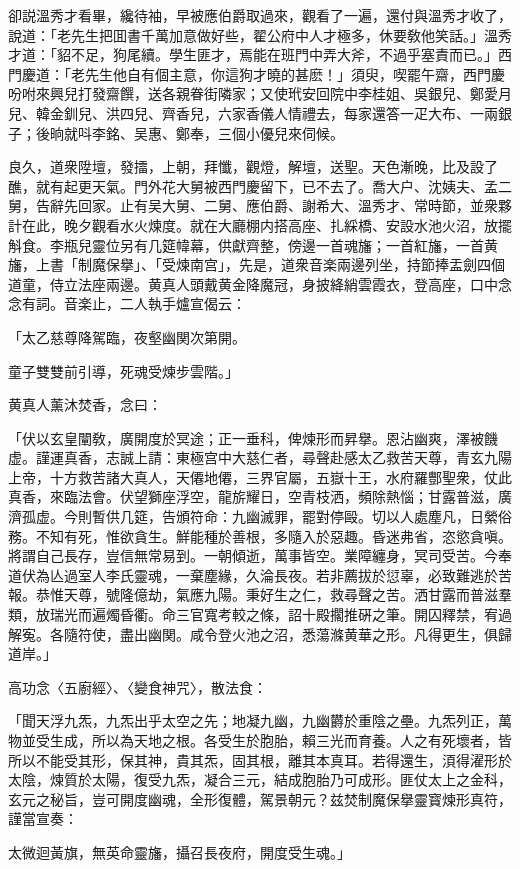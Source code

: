 卻説溫秀才看畢，纔待袖，早被應伯爵取過來，觀看了一遍，還付與溫秀才收了，說道：「老先生把囬書千萬加意做好些，翟公府中人才極多，休要敎他笑話。」溫秀才道：「貂不足，狗尾續。學生匪才，焉能在班門中弄大斧，不過乎塞責而已。」西門慶道：「老先生他自有個主意，你這狗才曉的甚麽！」須臾，喫罷午齋，西門慶吩咐來興兒打發齋饌，送各親眷街隣家；又使玳安回院中李桂姐、吳銀兒、鄭愛月兒、韓金釧兒、洪四兒、齊香兒，六家香儀人情禮去，每家還答一疋大布、一兩銀子；後晌就呌李銘、吴惠、鄭奉，三個小優兒來伺候。

良久，道衆陞壇，發擂，上朝，拜懺，觀燈，解壇，送聖。天色漸晚，比及設了醮，就有起更天氣。門外花大舅被西門慶留下，已不去了。喬大户、沈姨夫、孟二舅，告辭先回家。止有吴大舅、二舅、應伯爵、謝希大、溫秀才、常時節，並衆夥計在此，晚夕觀看水火煉度。就在大廳棚内搭高座、扎綵橋、安設水池火沼，放擺斛食。李瓶兒靈位另有几筵幃幕，供獻齊整，傍邊一首魂旛；一首紅旛，一首黄旛，上書「制魔保擧」、「受煉南宫」，先是，道衆音楽兩邊列坐，持節捧盂劍四個道童，侍立法座兩邊。黄真人頭戴黄金降魔冠，身披絳綃雲霞衣，登高座，口中念念有詞。音楽止，二人執手爐宣偈云：

\begin{myquote}
「太乙慈尊降駕臨，夜壑幽関次第開。

童子雙雙前引導，死魂受煉步雲階。」
\end{myquote}

黄真人薰沐焚香，念曰：

\begin{myquote}[\markfont]
「伏以玄皇闡敎，廣開度於冥途；正一垂科，俾煉形而昇擧。恩沾幽爽，澤被饑虚。謹運真香，志誠上請：東極宫中大慈仁者，尋聲赴感太乙救苦天尊，青玄九陽上帝，十方救苦諸大真人，天僊地僊，三界官屬，五嶽十王，水府羅酆聖衆，仗此真香，來臨法會。伏望獅座浮空，龍旂耀日，空青枝洒，頻除熱惱；甘露普滋，廣濟孤虚。今則暫供几筵，告頒符命：九幽滅罪，罷對停毆。切以人處塵凡，日縈俗務。不知有死，惟欲貪生。鮮能種於善根，多隨入於惡趣。昏迷弗省，恣慾貪嗔。將謂自己長存，豈信無常易到。一朝傾逝，萬事皆空。業障纏身，冥司受苦。今奉道伏為亾過室人李氏靈魂，一棄塵緣，久淪長夜。若非薦拔於愆辜，必致難逃於苦報。恭惟天尊，號隆億劫，氣應九陽。秉好生之仁，救尋聲之苦。洒甘露而普滋羣類，放瑞光而遍燭昏衢。命三官寬考較之條，詔十殿擱推硏之筆。開囚釋禁，宥過解寃。各隨符使，盡出幽関。咸令登火池之沼，悉蕩滌黄華之形。凡得更生，俱歸道岸。」
\end{myquote}

高功念〈五廚經〉、〈變食神咒〉，散法食：

\begin{myquote}[\markfont]
「聞天浮九炁，九炁出乎太空之先；地凝九幽，九幽欝於重陰之壘。九炁列正，萬物並受生成，所以為天地之根。各受生於胞胎，賴三光而育養。人之有死壞者，皆所以不能受其形，保其神，貴其炁，固其根，離其本真耳。若得還生，湏得濯形於太陰，煉質於太陽，復受九炁，凝合三元，結成胞胎乃可成形。匪仗太上之金科，玄元之秘旨，豈可開度幽魂，全形復體，駕景朝元？兹焚制魔保擧靈寳煉形真符，謹當宣奏：

太微迴黃旗，無英命靈旛，攝召長夜府，開度受生魂。」
\end{myquote}

